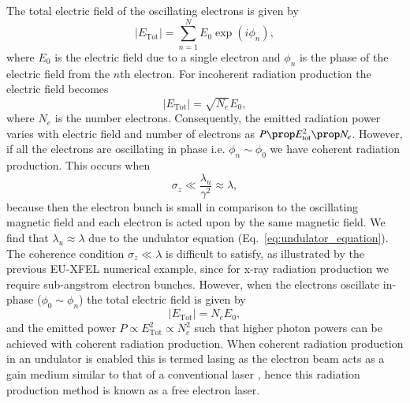 \documentclass[../main.tex]{subfiles}
\begin{document}
The total electric field of the oscillating electrons is given by
\begin{equation}
\lvert E_{\mathrm{Tot}}\rvert = \sum_{n=1}^{N}E_{0}\exp\left(i\phi_{n}\right),
\label{eq:undulator_bunch_electric_field}    
\end{equation}
where $E_{0}$ is the electric field due to a single electron and $\phi_{n}$ is the phase of the electric field from the $n$th electron. For incoherent radiation production the electric field becomes \cite{} %
\begin{equation}
\lvert E_{\mathrm{Tot}}\rvert = \sqrt{N_{e}}E_{0},
\label{eq:incoherent_electric_field}
\end{equation}
where $N_{e}$ is the number electrons. Consequently, the emitted radiation power varies with electric field and number of electrons as $P \prop E_{\mathrm{tot}}^{2} \prop N_{e}$. However, if all the electrons are oscillating in phase i.e. $\phi_{n}\sim \phi_{0}$ we have coherent radiation production. This occurs when
\begin{equation}
\sigma_{z} \ll \frac{\lambda_{u}}{\gamma^{2}} \approx \lambda,
\label{eq:coherence_condition}
\end{equation}
because then the electron bunch is small in comparison to the oscillating magnetic field and each electron is acted upon by the same magnetic field. We find that $\lambda_{u} \approx \lambda$ due to the undulator equation (Eq.~\ref{eq:undulator_equation}). The coherence condition $\sigma_{z} \ll \lambda$ is difficult to satisfy, as illustrated by the previous EU-XFEL numerical example, since for x-ray radiation production we require sub-angstrom electron bunches. However, when the electrons oscillate in-phase ($\phi_{0}\sim \phi_{n}$) the total electric field is given by
\begin{equation}
\lvert E_{\mathrm{Tot}}\rvert = N_{e}E_{0},
\label{eq:coherent_electric_field}    
\end{equation}
and the emitted power $P \propto E_{\mathrm{Tot}}^{2} \propto N_{e}^{2}$ \cite{pellegrini2016physics} such that higher photon powers can be achieved with coherent radiation production. When coherent radiation production in an undulator is enabled this is termed lasing as the electron beam acts as a gain medium similar to that of a conventional laser \cite{brau1988free}, hence this radiation production method is known as a free electron laser. 
\end{document}
